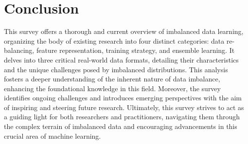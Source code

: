 \section{Conclusion}
\label{sec:conclusion}
This survey offers a thorough and current overview of imbalanced data learning, organizing the body of existing research into four distinct categories: data re-balancing, feature representation, training strategy, and ensemble learning. It delves into three critical real-world data formats, detailing their characteristics and the unique challenges posed by imbalanced distributions. This analysis fosters a deeper understanding of the inherent nature of data imbalance, enhancing the foundational knowledge in this field. Moreover, the survey identifies ongoing challenges and introduces emerging perspectives with the aim of inspiring and steering future research. Ultimately, this survey strives to act as a guiding light for both researchers and practitioners, navigating them through the complex terrain of imbalanced data and encouraging advancements in this crucial area of machine learning.